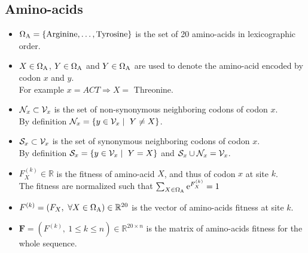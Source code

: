 \subsection{Amino-acids}
\begin{itemize}
	\item $\Omega_{\mathrm{A}} = \left\{ \mathrm{Arginine}, \dots ,\mathrm{Tyrosine} \right\} $ is the set of 20 amino-acids in lexicographic order.
	\item $X \in \Omega_{\mathrm{A}} $, $Y \in \Omega_{\mathrm{A}}$ and $Y \in \Omega_{\mathrm{A}}$ are used to denote the amino-acid encoded by codon $x$ and $y$.
	\\For example $x=ACT \Rightarrow X=$ Threonine.
	\item $\mathcal{N}_x \subset \mathcal{V}_x $ is the set of non-synonymous neighboring codons of codon $x$.
	\\By definition $\mathcal{N}_x = \left\{ y \in \mathcal{V}_x  \mid \ Y \neq X  \right\} $.
	\item $\mathcal{S}_x \subset \mathcal{V}_x $ is the set of synonymous neighboring codons of codon $x$.
	\\By definition $\mathcal{S}_x = \left\{ y \in \mathcal{V}_x \mid \ Y = X  \right\} $ and $\mathcal{S}_x \cup \mathcal{N}_x = \mathcal{V}_x $.
	\item $F_X^{(k)} \in \mathbb{R} $ is the fitness of amino-acid $X$, and thus of codon $x$ at site $k$.\\
	The fitness are normalized such that $\sum_{X \in \Omega_{\mathrm{A}}}\mathrm{e}^{F_X^{(k)}} = 1 $
	\item $F^{(k)} = \left( F_X , \ \forall X \in \Omega_{\mathrm{A}} \right) \in \mathbb{R}^{20} $ is the vector of amino-acids fitness at site $k$.
	\item $\bm{F} = \left( F^{(k)} , \  1 \leq k \leq n \right) \in \mathbb{R}^{20 \times n} $ is the matrix of amino-acids fitness for the whole sequence.
\end{itemize}

